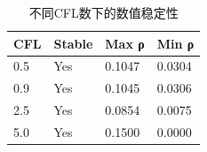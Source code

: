 \begin{table}
\caption{不同CFL数下的数值稳定性}
\label{tab:cfl}
\begin{tabular}{llll}
\toprule
CFL & Stable & Max ρ & Min ρ \\
\midrule
0.5 & Yes & 0.1047 & 0.0304 \\
0.9 & Yes & 0.1045 & 0.0306 \\
2.5 & Yes & 0.0854 & 0.0075 \\
5.0 & Yes & 0.1500 & 0.0000 \\
\bottomrule
\end{tabular}
\end{table}
